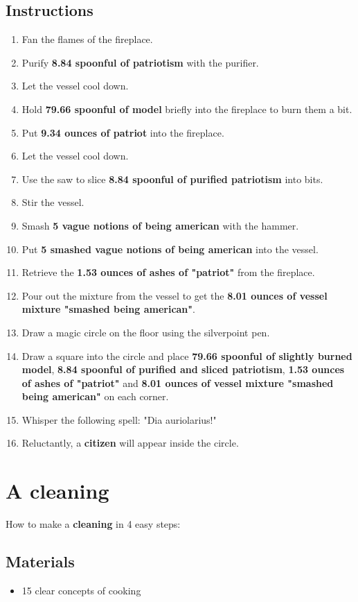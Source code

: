 \documentclass{article}
\begin{document}
\subsection{Instructions}\begin{enumerate}
\item 
Fan the flames of the fireplace.
\item 
Purify \textbf{8.84 spoonful of patriotism} with the purifier.
\item 
Let the vessel cool down.
\item 
Hold \textbf{79.66 spoonful of model} briefly into the fireplace to burn them a bit.
\item 
Put \textbf{9.34 ounces of patriot} into the fireplace.
\item 
Let the vessel cool down.
\item 
Use the saw to slice \textbf{8.84 spoonful of purified patriotism} into bits.
\item 
Stir the vessel.
\item 
Smash \textbf{5 vague notions of being american} with the hammer.
\item 
Put \textbf{5 smashed vague notions of being american} into the vessel.
\item 
Retrieve the \textbf{1.53 ounces of ashes of "patriot"} from the fireplace.
\item 
Pour out the mixture from the vessel to get the \textbf{8.01 ounces of vessel mixture "smashed being american"}.
\item 
Draw a magic circle on the floor using the silverpoint pen.
\item 
Draw a square into the circle and place \textbf{79.66 spoonful of slightly burned model}, \textbf{8.84 spoonful of purified and sliced patriotism}, \textbf{1.53 ounces of ashes of "patriot"} and \textbf{8.01 ounces of vessel mixture "smashed being american"} on each corner.
\item 
Whisper the following spell: "Dia auriolarius!"
\item 
Reluctantly, a \textbf{citizen} will appear inside the circle.
\end{enumerate}
\newpage
\section{A cleaning}How to make a \textbf{cleaning} in 4 easy steps:

\subsection{Materials}\begin{itemize}
\item 
15 clear concepts of cooking
\end{itemize}
\end{document}
